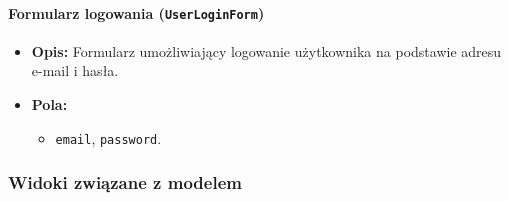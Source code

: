 \documentclass[12pt,a4paper,oneside]{article}
\theoremstyle{definition}
\numberwithin{equation}{section}
\begin{document}
\paragraph{Formularz logowania (\texttt{UserLoginForm})}

\begin{itemize}
    \item \textbf{Opis:} Formularz umożliwiający logowanie użytkownika na podstawie adresu e-mail i hasła.
    \item \textbf{Pola:}
    \begin{itemize}
        \item \texttt{email}, \texttt{password}.
    \end{itemize}
\end{itemize}

\subsubsection*{Widoki związane z modelem}
\end{document}
